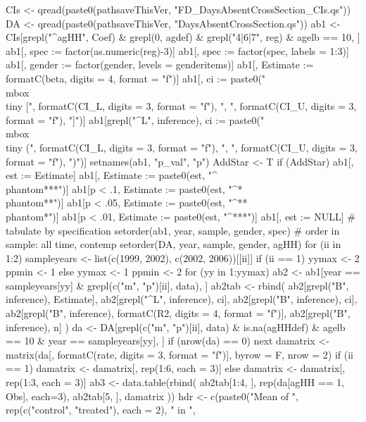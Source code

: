 \begin{Schunk}
\begin{Sinput}
CIs <- qread(paste0(pathsaveThisVer, "FD_DaysAbsentCrossSection_CIs.qs"))
DA <- qread(paste0(pathsaveThisVer, "DaysAbsentCrossSection.qs"))
ab1 <- CIs[grepl("^agHH", Coef) & grepl(0, agdef) & grepl("4|6|7", reg) & agelb == 10, ]
ab1[, spec := factor(as.numeric(reg)-3)]
ab1[, spec := factor(spec, labels = 1:3)]
ab1[, gender := factor(gender, levels = genderitems)]
ab1[, Estimate := formatC(beta, digits = 4, format = "f")]
ab1[, ci := paste0("\\mbox{\\tiny [", 
  formatC(CI_L, digits = 3, format = "f"), ", ", 
  formatC(CI_U, digits = 3, format = "f"), "]}")]
ab1[grepl("^L", inference), ci := paste0("\\mbox{\\tiny (", 
  formatC(CI_L, digits = 3, format = "f"), ", ", 
  formatC(CI_U, digits = 3, format = "f"), ")}")]
setnames(ab1, "p_val", "p")
AddStar <- T
if (AddStar) {
  ab1[, est := Estimate]
  ab1[, Estimate := paste0(est, "^{\\phantom{***}}")]
  ab1[p < .1, Estimate := paste0(est, "^{*\\phantom{**}}")]
  ab1[p < .05, Estimate := paste0(est, "^{**\\phantom{*}}")]
  ab1[p < .01, Estimate := paste0(est, "^{***}")]
  ab1[, est := NULL]
}
# tabulate by specification
setorder(ab1, year, sample, gender, spec) # order in sample: all time, contemp
setorder(DA, year, sample, gender, agHH)
for (ii in 1:2) {
  sampleyears <- list(c(1999, 2002), c(2002, 2006))[[ii]]
  if (ii == 1) {
    yymax <- 2 
    ppmin <- 1
  } else {
    yymax <- 1
    ppmin <- 2
  }
  for (yy in 1:yymax) {
    ab2 <- ab1[year == sampleyears[yy] & grepl(c("m", "p")[ii], data), ]
    ab2tab <- rbind(
        ab2[grepl("B", inference), Estimate],
        ab2[grepl("^L", inference), ci],
        ab2[grepl("B", inference), ci],
        ab2[grepl("B", inference), formatC(R2, digits = 4, format = "f")],
        ab2[grepl("B", inference), n]
       )
    da <- DA[grepl(c("m", "p")[ii], data) & is.na(agHHdef) & agelb == 10 & year == sampleyears[yy], ]
    if (nrow(da) == 0) next
    damatrix <- matrix(da[, formatC(rate, digits = 3, format = "f")], byrow = F, nrow = 2)
    if (ii == 1) 
      damatrix <- damatrix[, rep(1:6, each = 3)] else
      damatrix <- damatrix[, rep(1:3, each = 3)] 
    ab3 <- data.table(rbind(
      ab2tab[1:4, ], rep(da[agHH == 1, Obs], each=3), 
      ab2tab[5, ], damatrix
     ))
    hdr <- c(paste0("Mean of ", rep(c("control", "treated"), each = 2), " in ", 
}}
\end{Sinput}
\end{Schunk}
